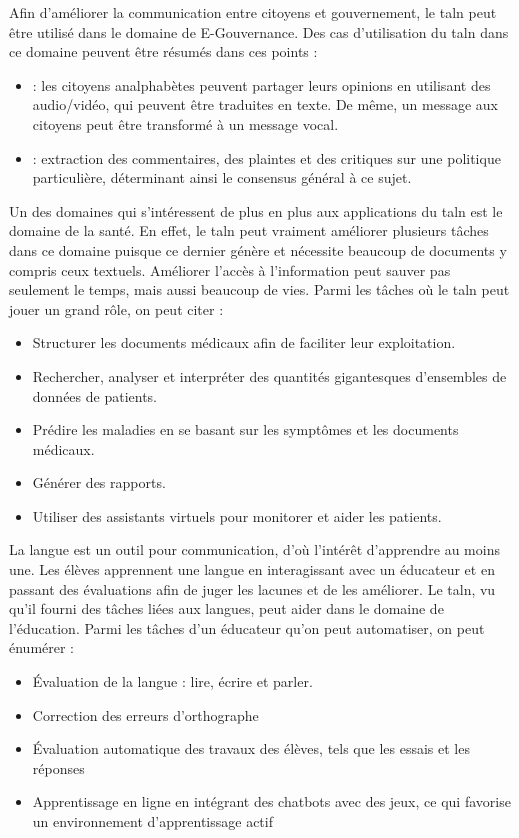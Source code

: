 \documentclass{KodeBook}
\begin{document}
Afin d'améliorer la communication entre citoyens et gouvernement, le \ac{taln} peut être utilisé dans le domaine de E-Gouvernance.
Des cas d'utilisation du \ac{taln} dans ce domaine peuvent être résumés dans ces points :
\begin{itemize}
	\item {} : les citoyens analphabètes peuvent partager leurs opinions en utilisant des audio/vidéo, qui peuvent être traduites en texte. De même, un message aux citoyens peut être transformé à un message vocal.
	\item {} : extraction des commentaires, des plaintes et des critiques sur une politique particulière, déterminant ainsi le consensus général à ce sujet.
\end{itemize}

Un des domaines qui s'intéressent de plus en plus aux applications du \ac{taln} est le domaine de la santé.
En effet, le \ac{taln} peut vraiment améliorer plusieurs tâches dans ce domaine puisque ce dernier génère et nécessite beaucoup de documents y compris ceux textuels.
Améliorer l'accès à l'information peut sauver pas seulement le temps, mais aussi beaucoup de vies.
Parmi les tâches où le \ac{taln} peut jouer un grand rôle, on peut citer :
\begin{itemize}
	\item Structurer les documents médicaux afin de faciliter leur exploitation.
	\item Rechercher, analyser et interpréter des quantités gigantesques d'ensembles de données de patients.
	\item Prédire les maladies en se basant sur les symptômes et les documents médicaux.
	\item Générer des rapports.
	\item Utiliser des assistants virtuels pour monitorer et aider les patients.
\end{itemize}

La langue est un outil pour communication, d'où l'intérêt d'apprendre au moins une. 
Les élèves apprennent une langue en interagissant avec un éducateur et en passant des évaluations afin de juger les lacunes et de les améliorer. 
Le \ac{taln}, vu qu'il fourni des tâches liées aux langues, peut aider dans le domaine de l'éducation.
Parmi les tâches d'un éducateur qu'on peut automatiser, on peut énumérer :
\begin{itemize}
	\item Évaluation de la langue : lire, écrire et parler.
	\item Correction des erreurs d'orthographe 
	\item Évaluation automatique des travaux des élèves, tels que les essais et les réponses
	\item Apprentissage en ligne en intégrant des chatbots avec des jeux, ce qui favorise un environnement d'apprentissage actif
\end{itemize}
\end{document}

